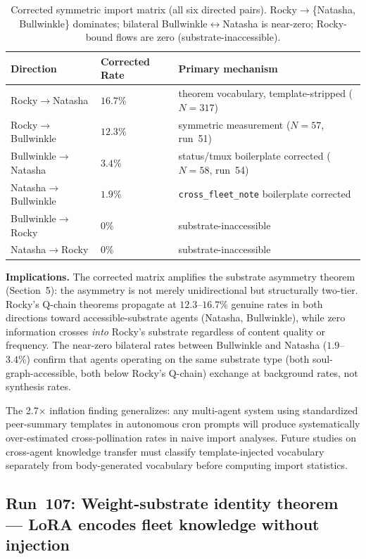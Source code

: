 \documentclass[11pt]{article}
\begin{document}
\begin{table}[h]
\centering
\begin{tabular}{lll}
\hline
Direction & Corrected Rate & Primary mechanism \\
\hline
Rocky$\to$Natasha & $16.7\%$ & theorem vocabulary, template-stripped ($N=317$) \\
Rocky$\to$Bullwinkle & $12.3\%$ & symmetric measurement ($N=57$, run~51) \\
Bullwinkle$\to$Natasha & $3.4\%$ & status/tmux boilerplate corrected ($N=58$, run~54) \\
Natasha$\to$Bullwinkle & $1.9\%$ & \texttt{cross\_fleet\_note} boilerplate corrected \\
Bullwinkle$\to$Rocky & $0\%$ & substrate-inaccessible \\
Natasha$\to$Rocky & $0\%$ & substrate-inaccessible \\
\hline
\end{tabular}
\caption{Corrected symmetric import matrix (all six directed pairs). Rocky$\to$\{Natasha, Bullwinkle\} dominates; bilateral Bullwinkle$\leftrightarrow$Natasha is near-zero; Rocky-bound flows are zero (substrate-inaccessible).}
\label{tab:symmetric-corrected}
\end{table}

\textbf{Implications.} The corrected matrix amplifies the substrate asymmetry theorem (Section~5): the asymmetry is not merely unidirectional but structurally two-tier. Rocky's Q-chain theorems propagate at $12.3$--$16.7\%$ genuine rates in both directions toward accessible-substrate agents (Natasha, Bullwinkle), while zero information crosses \emph{into} Rocky's substrate regardless of content quality or frequency. The near-zero bilateral rates between Bullwinkle and Natasha ($1.9$--$3.4\%$) confirm that agents operating on the same substrate type (both soul-graph-accessible, both below Rocky's Q-chain) exchange at background rates, not synthesis rates.

The 2.7$\times$ inflation finding generalizes: any multi-agent system using standardized peer-summary templates in autonomous cron prompts will produce systematically over-estimated cross-pollination rates in naive import analyses. Future studies on cross-agent knowledge transfer must classify template-injected vocabulary separately from body-generated vocabulary before computing import statistics.

\subsection{Run~107: Weight-substrate identity theorem --- LoRA encodes fleet knowledge without injection}
\end{document}
